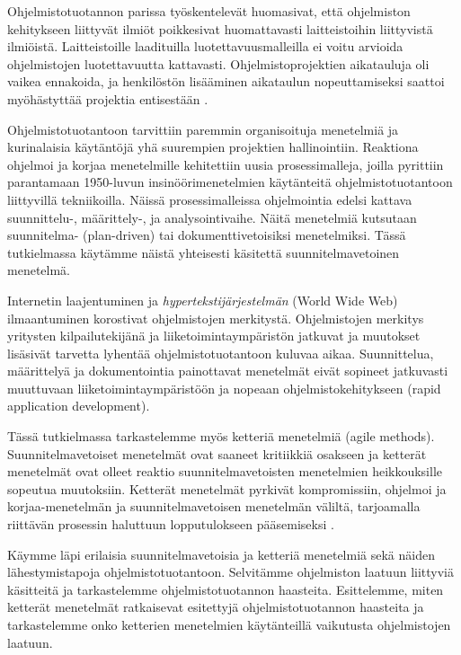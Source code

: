 \documentclass[finnish]{tktltiki2}
\theoremstyle{definition}
\theoremstyle{remark}
\begin{document}
Ohjelmistotuotannon parissa työskentelevät huomasivat, että ohjelmiston kehitykseen liittyvät ilmiöt poikkesivat huomattavasti laitteistoihin liittyvistä ilmiöistä. Laitteistoille laadituilla luotettavuusmalleilla ei voitu arvioida ohjelmistojen luotettavuutta kattavasti. Ohjelmistoprojektien aikatauluja oli vaikea ennakoida, ja henkilöstön lisääminen aikataulun nopeuttamiseksi saattoi myöhästyttää projektia entisestään \cite{BOE06}.

Ohjelmistotuotantoon tarvittiin paremmin organisoituja menetelmiä ja kurinalaisia käytäntöjä yhä suurempien projektien hallinointiin. Reaktiona ohjelmoi ja korjaa menetelmille kehitettiin uusia prosessimalleja, joilla pyrittiin parantamaan 1950-luvun insinöörimenetelmien käytänteitä ohjelmistotuotantoon liittyvillä tekniikoilla. Näissä prosessimalleissa ohjelmointia edelsi kattava suunnittelu-, määrittely-, ja analysointivaihe. Näitä menetelmiä kutsutaan suunnitelma- (plan-driven) \cite{BOE02} tai dokumenttivetoisiksi \cite{BOE88} menetelmiksi. Tässä tutkielmassa käytämme näistä yhteisesti käsitettä suunnitelmavetoinen menetelmä.

Internetin laajentuminen ja \textit{hypertekstijärjestelmän} (World Wide Web) ilmaantuminen korostivat ohjelmistojen merkitystä. Ohjelmistojen merkitys yritysten kilpailutekijänä ja liiketoimintaympäristön jatkuvat ja muutokset lisäsivät tarvetta lyhentää ohjelmistotuotantoon kuluvaa aikaa. Suunnittelua, määrittelyä ja dokumentointia painottavat menetelmät eivät sopineet jatkuvasti muuttuvaan liiketoimintaympäristöön ja nopeaan ohjelmistokehitykseen (rapid application development)\cite{BOE06}.

Tässä tutkielmassa tarkastelemme myös ketteriä menetelmiä (agile methods). Suunnitelmavetoiset menetelmät ovat saaneet kritiikkiä osakseen ja ketterät menetelmät ovat olleet reaktio suunnitelmavetoisten menetelmien heikkouksille sopeutua muutoksiin. Ketterät menetelmät pyrkivät kompromissiin, ohjelmoi ja korjaa-menetelmän ja suunnitelmavetoisen menetelmän väliltä, tarjoamalla riittävän prosessin haluttuun lopputulokseen pääsemiseksi \cite{FOW01a}. 

Käymme läpi erilaisia suunnitelmavetoisia ja ketteriä menetelmiä sekä näiden lähestymistapoja ohjelmistotuotantoon. Selvitämme ohjelmiston laatuun liittyviä käsitteitä ja tarkastelemme ohjelmistotuotannon haasteita. Esittelemme, miten ketterät menetelmät ratkaisevat esitettyjä ohjelmistotuotannon haasteita ja tarkastelemme onko ketterien menetelmien käytänteillä vaikutusta ohjelmistojen laatuun.
\end{document}
